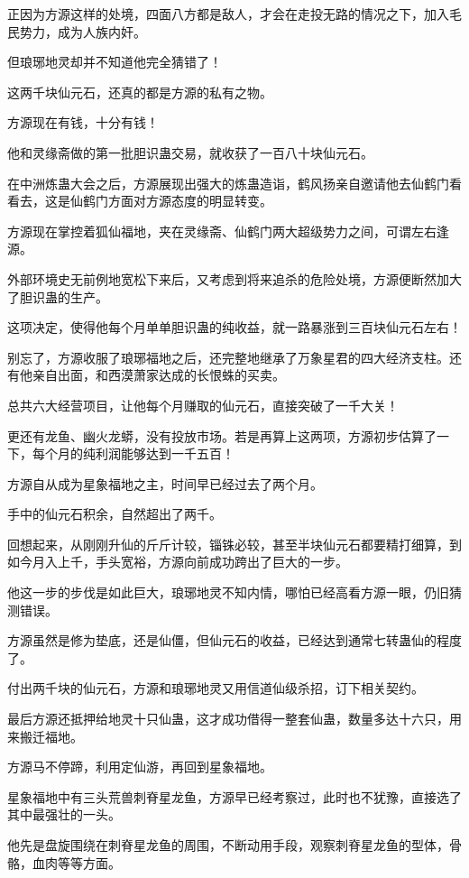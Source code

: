 \begin{this_body}
正因为方源这样的处境，四面八方都是敌人，才会在走投无路的情况之下，加入毛民势力，成为人族内奸。

但琅琊地灵却并不知道他完全猜错了！

这两千块仙元石，还真的都是方源的私有之物。

方源现在有钱，十分有钱！

他和灵缘斋做的第一批胆识蛊交易，就收获了一百八十块仙元石。

在中洲炼蛊大会之后，方源展现出强大的炼蛊造诣，鹤风扬亲自邀请他去仙鹤门看看去，这是仙鹤门方面对方源态度的明显转变。

方源现在掌控着狐仙福地，夹在灵缘斋、仙鹤门两大超级势力之间，可谓左右逢源。

外部环境史无前例地宽松下来后，又考虑到将来追杀的危险处境，方源便断然加大了胆识蛊的生产。

这项决定，使得他每个月单单胆识蛊的纯收益，就一路暴涨到三百块仙元石左右！

别忘了，方源收服了琅琊福地之后，还完整地继承了万象星君的四大经济支柱。还有他亲自出面，和西漠萧家达成的长恨蛛的买卖。

总共六大经营项目，让他每个月赚取的仙元石，直接突破了一千大关！

更还有龙鱼、幽火龙蟒，没有投放市场。若是再算上这两项，方源初步估算了一下，每个月的纯利润能够达到一千五百！

方源自从成为星象福地之主，时间早已经过去了两个月。

手中的仙元石积余，自然超出了两千。

回想起来，从刚刚升仙的斤斤计较，锱铢必较，甚至半块仙元石都要精打细算，到如今月入上千，手头宽裕，方源向前成功跨出了巨大的一步。

他这一步的步伐是如此巨大，琅琊地灵不知内情，哪怕已经高看方源一眼，仍旧猜测错误。

方源虽然是修为垫底，还是仙僵，但仙元石的收益，已经达到通常七转蛊仙的程度了。

付出两千块的仙元石，方源和琅琊地灵又用信道仙级杀招，订下相关契约。

最后方源还抵押给地灵十只仙蛊，这才成功借得一整套仙蛊，数量多达十六只，用来搬迁福地。

方源马不停蹄，利用定仙游，再回到星象福地。

星象福地中有三头荒兽刺脊星龙鱼，方源早已经考察过，此时也不犹豫，直接选了其中最强壮的一头。

他先是盘旋围绕在刺脊星龙鱼的周围，不断动用手段，观察刺脊星龙鱼的型体，骨骼，血肉等等方面。


\end{this_body}
